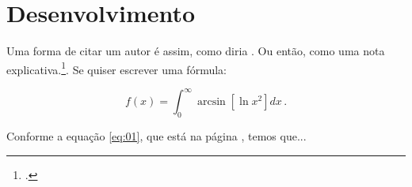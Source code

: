 \documentclass[
	12pt,				%
	openright,			%
	twoside,			%
	a4paper,			%
	english,			%
	brazil				%
	]{abntex2}
\begin{document}


\chapter{Desenvolvimento}
%
Uma forma de citar um autor é assim, como diria \textcite{descartes-carta-mersene}. Ou então, como uma nota explicativa.\footcite[Esta é uma nota explicativa. Cf. e.g.,][\S 12]{boyle1772}. Se quiser escrever uma fórmula:

\begin{equation}
f(x) = \int_{0}^{\infty} \arcsin \left[\ln x^2 \right] dx \,.
\label{eq:01}
\end{equation}

Conforme a equação \eqref{eq:01}, que está na página \pageref{eq:01}, temos que...
\end{document}
